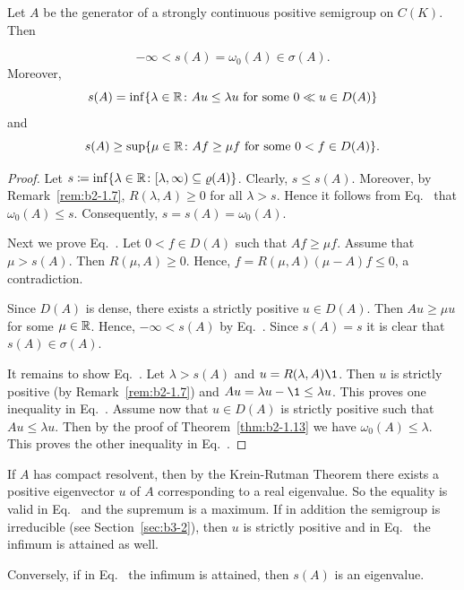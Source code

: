 \begin{corollary}\label{cor:b2-1.14}
Let $A$ be the generator of a strongly continuous positive semigroup on $C(K)$.
Then

\begin{equation}\label{eq:b2-1.7}
-\infty < s(A) = \omega_{0}(A) \in \sigma(A).
\end{equation}
Moreover,
\begin{equation}\label{eq:b2-1.8}
s(A) = \inf\{\lambda \in \R \colon Au \leq \lambda u \text{ for some } 0 \ll u \in D(A)\}
\end{equation}
and
\begin{equation}\label{eq:b2-1.9}
s(A) \geq \sup\{\mu \in \R \colon Af \geq \mu f \text{ for some } 0 < f \in D(A)\}.
\end{equation}
\end{corollary}
\begin{proof}
Let $s \coloneq \inf\{\lambda \in \R \colon [\lambda,\infty) \subseteq \rho(A)\}$.
Clearly, $s \leq s(A)$.
Moreover, by Remark~\ref{rem:b2-1.7}, $R(\lambda,A) \geq 0$ for all $\lambda > s$.
Hence it follows from Eq.~ that $\omega_{0}(A) \leq s$.
Consequently, $s = s(A) = \omega_{0}(A)$.

Next we prove Eq.~.
Let $0 < f \in D(A)$ such that $Af \geq \mu f$.
Assume that $\mu > s(A)$.
Then $R(\mu,A) \geq 0$.
Hence, $f = R(\mu,A)(\mu-A)f \leq 0$, a contradiction.

Since $D(A)$ is dense, there exists a strictly positive $u \in D(A)$.
Then $Au \geq \mu u$ for some $\mu \in \mathbb{R}$.
Hence, $-\infty < s(A)$ by Eq.~. 
Since $s(A) = s$ it is clear that $s(A) \in \sigma(A)$.

It remains to show Eq.~. 
Let $\lambda > s(A)$ and $u = R(\lambda,A)\1$.
Then $u$ is strictly positive (by  Remark~\ref{rem:b2-1.7}) and $Au = \lambda u - \1 \leq \lambda u$.
This proves one inequality in Eq.~. 
Assume now that $u \in D(A)$ is strictly positive such that $Au \leq \lambda u$.
Then by the proof of Theorem~\ref{thm:b2-1.13} we have $\omega_{0}(A) \leq \lambda$.
This proves the other inequality in Eq.~. 
\end{proof}
\begin{remark}\label{rem:b2-1.15}
If\/ $A$ has compact resolvent, then by the Krein-Rutman Theorem there exists a positive eigenvector $u$ of\/ $A$ corresponding to a real eigenvalue.
So the equality is valid in Eq.~  
and the supremum is a maximum.
If in addition the semigroup is irreducible (see Section~\ref{sec:b3-2}), then $u$ is strictly positive and in Eq.~ 
the infimum is attained as well.

Conversely, if in Eq.~ 
the infimum is attained, then $s(A)$ is an eigenvalue.
\end{remark}

